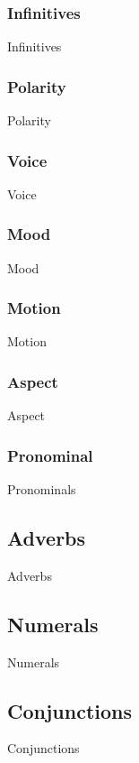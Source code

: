 \subsubsection{Infinitives}
\label{sec:verb-infinitives}

Infinitives

\subsubsection{Polarity}
\label{sec:verb-polarity}

Polarity

\subsubsection{Voice}
\label{sec:verb-voice}

Voice

\subsubsection{Mood}
\label{sec:verb-mood}

Mood

\subsubsection{Motion}
\label{sec:verb-motion}

Motion

\subsubsection{Aspect}
\label{sec:verb-aspect}

Aspect

\subsubsection{Pronominal}
\label{sec:verb-pronominals}

Pronominals

\subsection{Adverbs}
\label{sec:adverbs}

Adverbs

\subsection{Numerals}
\label{sec:numerals}

Numerals

\subsection{Conjunctions}
\label{sec:conjunctions}

Conjunctions